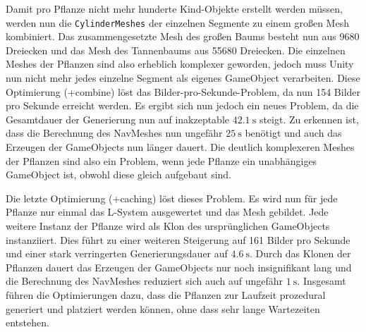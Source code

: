 Damit pro Pflanze nicht mehr hunderte Kind-Objekte erstellt werden müssen, werden nun die \texttt{CylinderMeshes} der einzelnen Segmente zu einem großen Mesh kombiniert.
Das zusammengesetzte Mesh des großen Baums besteht nun aus 9680 Dreiecken und das Mesh des Tannenbaums aus 55680 Dreiecken.
Die einzelnen Meshes der Pflanzen sind also erheblich komplexer geworden, jedoch muss Unity nun nicht mehr jedes einzelne Segment als eigenes GameObject verarbeiten.
Diese Optimierung (+combine) löst das Bilder-pro-Sekunde-Problem, da nun 154 Bilder pro Sekunde erreicht werden.
Es ergibt sich nun jedoch ein neues Problem, da die Gesamtdauer der Generierung nun auf inakzeptable $\SI{42.1}{\second}$ steigt.
Zu erkennen ist, dass die Berechnung des NavMeshes nun ungefähr $\SI{25}{\second}$ benötigt und auch das Erzeugen der GameObjects nun länger dauert.
Die deutlich komplexeren Meshes der Pflanzen sind also ein Problem, wenn jede Pflanze ein unabhängiges GameObject ist, obwohl diese gleich aufgebaut sind.

Die letzte Optimierung (+caching) löst dieses Problem.
Es wird nun für jede Pflanze nur einmal das L-System ausgewertet und das Mesh gebildet.
Jede weitere Instanz der Pflanze wird als Klon des ursprünglichen GameObjects instanziiert.
Dies führt zu einer weiteren Steigerung auf 161 Bilder pro Sekunde und einer stark verringerten Generierungsdauer auf $\SI{4.6}{\second}$.
Durch das Klonen der Pflanzen dauert das Erzeugen der GameObjects nur noch insignifikant lang und die Berechnung des NavMeshes reduziert sich auch auf ungefähr $\SI{1}{\second}$.
Insgesamt führen die Optimierungen dazu, dass die Pflanzen zur Laufzeit prozedural generiert und platziert werden können, ohne dass sehr lange Wartezeiten entstehen.